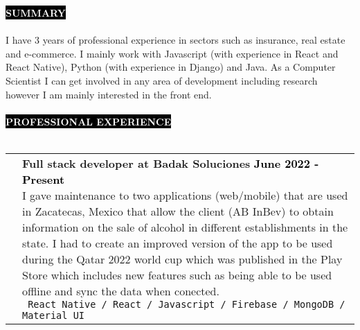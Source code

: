 \documentclass[11pt,A4]{article}
\makeatletter
\newcounter{a}
\newcounter{b}
\newcounter{c}
\newcommand{\cvsection}[1] {
  \textcolor{white}{\MakeUppercase{\textbf{#1}}}
}
\newcommand{\cvsect}[1]{
  \colorbox{black}{{\cvsection{#1}}}\\ \\%
}
\newenvironment{entrylist}{%
  \begin{tabular*}{\textwidth}[t]{@{\extracolsep{\fill}}ll}
  }{%
  \end{tabular*}
}
\newcommand{\entry}[5]{%
  &\parbox[t]{17.5cm}{%
    \large\textbf{#1}%
    \hfill
    {\small \textbf{\textcolor{black}{#2}}}\\%
    \normalsize #4\\
    \texttt{#5}
  }\\\\}
\newcommand{\slashsep}{
  \hspace{1mm}/\hspace{1mm}
}
\makeatother
\begin{document}
\cvsect{Summary} 
  I have 3 years of professional experience in sectors such as insurance, real estate and e-commerce. I mainly work with Javascript (with experience in React and React Native), Python (with experience in Django) and Java. As a Computer Scientist I can get involved in any area of development including research however I am mainly interested in the front end. \\
  \\
  \cvsect{Professional Experience}
  \begin{entrylist}
    \entry
    {Full stack developer at Badak Soluciones}
    {June 2022 - Present}
    {AB InBev}
    {I gave maintenance to two applications (web/mobile) that are used in Zacatecas, Mexico that allow the client (AB InBev) to obtain information on the sale of alcohol in different establishments in the state. I had to create an improved version of the app to be used during the Qatar 2022 world cup which was published in the Play Store which includes new features such as being able to be used offline and sync the data when conected.}
    { React Native \slashsep React \slashsep Javascript \slashsep Firebase \slashsep MongoDB \slashsep Material UI}
    \entry
    {Front end developer at GNP Seguros}
    {April 2021 - February 2022}
    {GNP Seguros}
    {UI for an insurance company where agents can fill all data required for several types of insurances based on their client's needs to get the cost and try to make an offer.}
    { React \slashsep Javascript \slashsep Redux \slashsep Material UI \slashsep Team Management}
    \entry
    {Full stack developer at M22}
    {October 2020 - February 2021}
    {M22}
    {UI for a real estate company where people can view details and availability of several places for make purchase agreement. All the data updates in real time and the content is modified from a Content Management System(CMS).}
    {React \slashsep Javascript \slashsep Strapi JS \slashsep QGIS \slashsep GraphQL \slashsep PostgreSQL}
    \entry
    {Full stack developer at Ultra maratón sierra mixe}
    {January 2020 - September 2020}
    {Ultra maratón sierra mixe}
    {This is a client's project on the automation of the processes involved in the realization of a marathon race such as registration, marketing and payment.}
    { React \slashsep Javascript \slashsep Google Firebase \slashsep Bootstrap}
  \end{entrylist}
\end{document}

